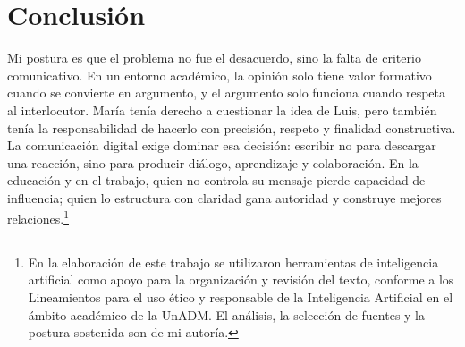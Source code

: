 \documentclass[
	spanish, %
	letterpaper, oneside
]{article}
\begin{document}
\section{Conclusión}

Mi postura es que el problema no fue el desacuerdo, sino la falta de criterio comunicativo. En un entorno académico, la opinión solo tiene valor formativo cuando se convierte en argumento, y el argumento solo funciona cuando respeta al interlocutor. María tenía derecho a cuestionar la idea de Luis, pero también tenía la responsabilidad de hacerlo con precisión, respeto y finalidad constructiva. La comunicación digital exige dominar esa decisión: escribir no para descargar una reacción, sino para producir diálogo, aprendizaje y colaboración. En la educación y en el trabajo, quien no controla su mensaje pierde capacidad de influencia; quien lo estructura con claridad gana autoridad y construye mejores relaciones.\footnote{En la elaboración de este trabajo se utilizaron herramientas de inteligencia artificial como apoyo para la organización y revisión del texto, conforme a los Lineamientos para el uso ético y responsable de la Inteligencia Artificial en el ámbito académico de la UnADM. El análisis, la selección de fuentes y la postura sostenida son de mi autoría.}


\end{document}
